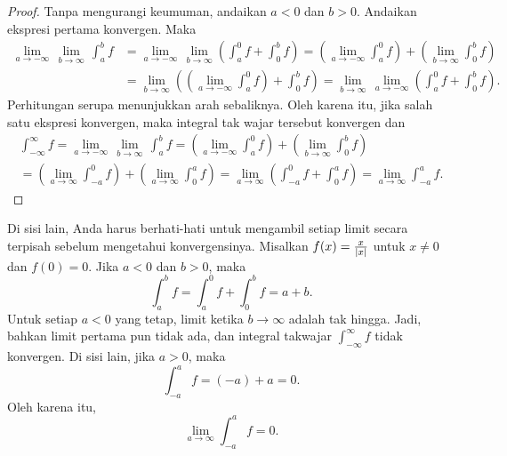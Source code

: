\begin{proof}
Tanpa mengurangi keumuman, andaikan $a < 0$ dan $b > 0$.  Andaikan
ekspresi pertama konvergen.  Maka
\begin{equation*}
\begin{split}
\lim_{a \to -\infty} \, \lim_{b \to \infty} \, \int_a^b f
& =
\lim_{a \to -\infty} \, \lim_{b \to \infty}
\left(
\int_a^0 f
+
\int_0^b f
\right)
=
\left(
\lim_{a \to -\infty}
\int_a^0 f
\right)
+
\left(
 \lim_{b \to \infty}
\int_0^b f
\right) \\
& = 
 \lim_{b \to \infty}
\left(
\left(
\lim_{a \to -\infty}
\int_a^0 f
\right) 
+
\int_0^b f
\right)
=
 \lim_{b \to \infty} \,
\lim_{a \to -\infty}
\left(
\int_a^0 f
+
\int_0^b f
\right)  .
\end{split}
\end{equation*}
Perhitungan serupa menunjukkan arah sebaliknya.  Oleh karena itu, jika
salah satu ekspresi konvergen, maka integral tak wajar tersebut konvergen
dan
\begin{multline*}
\int_{-\infty}^\infty f
=
\lim_{a \to -\infty} \, \lim_{b \to \infty} \, \int_a^b f
=
\left(
\lim_{a \to -\infty}
\int_a^0 f
\right)
+
\left(
 \lim_{b \to \infty}
\int_0^b f
\right)
\\
=
\left(
\lim_{a \to \infty}
\int_{-a}^0 f
\right)
+
\left(
 \lim_{a \to \infty}
\int_0^a f
\right)
=
\lim_{a \to \infty}
\left(
\int_{-a}^0 f
+
\int_0^a f
\right)
=
\lim_{a \to \infty}
\int_{-a}^a f .
\end{multline*}
\end{proof}

\begin{example}
Di sisi lain, Anda harus berhati-hati untuk
mengambil setiap limit secara terpisah sebelum mengetahui konvergensinya.  Misalkan
$f(x) = \frac{x}{\lvert {x} \rvert}$ untuk $x \neq 0$ dan $f(0) = 0$.
Jika $a < 0$ dan $b > 0$, maka
\begin{equation*}
\int_{a}^b f
=
\int_{a}^0 f
+
\int_{0}^b f
=
a+b .
\end{equation*}
Untuk setiap $a < 0$ yang tetap, limit ketika $b \to \infty$ adalah tak hingga.
Jadi, bahkan limit pertama pun tidak ada,
dan integral takwajar $\int_{-\infty}^\infty f$ tidak konvergen.
Di sisi lain, jika $a > 0$, maka
\begin{equation*}
\int_{-a}^{a} f
=
(-a)+a = 0 .
\end{equation*}
Oleh karena itu,
\begin{equation*}
\lim_{a\to\infty}
\int_{-a}^{a} f
= 0 .
\end{equation*}
\end{example}

